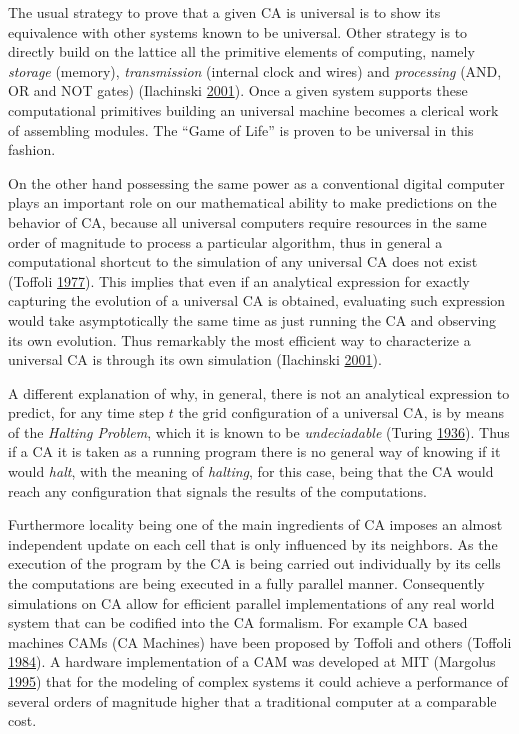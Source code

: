 \documentclass[
  openany]{book}
\begin{document}
The usual strategy to prove that a given CA is universal is to show its equivalence with other systems known to be universal. Other strategy is to directly build on the lattice all the primitive elements of computing, namely \emph{storage} (memory), \emph{transmission} (internal clock and wires) and \emph{processing} (AND, OR and NOT gates) (Ilachinski \protect\hyperlink{ref-ilachinski2001cellular}{2001}). Once a given system supports these computational primitives building an universal machine becomes a clerical work of assembling modules. The ``Game of Life'' is proven to be universal in this fashion.

On the other hand possessing the same power as a conventional digital computer plays an important role on our mathematical ability to make predictions on the behavior of CA, because all universal computers require resources in the same order of magnitude to process a particular algorithm, thus in general a computational shortcut to the simulation of any universal CA does not exist (Toffoli \protect\hyperlink{ref-toffoli1977cellular}{1977}). This implies that even if an analytical expression for exactly capturing the evolution of a universal CA is obtained, evaluating such expression would take asymptotically the same time as just running the CA and observing its own evolution. Thus remarkably the most efficient way to characterize a universal CA is through its own simulation (Ilachinski \protect\hyperlink{ref-ilachinski2001cellular}{2001}).

A different explanation of why, in general, there is not an analytical expression to predict, for any time step \(t\) the grid configuration of a universal CA, is by means of the \emph{Halting Problem}, which it is known to be \emph{undeciadable} (Turing \protect\hyperlink{ref-turing1936computable}{1936}). Thus if a CA it is taken as a running program there is no general way of knowing if it would \emph{halt}, with the meaning of \emph{halting}, for this case, being that the CA would reach any configuration that signals the results of the computations.

Furthermore locality being one of the main ingredients of CA imposes an almost independent update on each cell that is only influenced by its neighbors. As the execution of the program by the CA is being carried out individually by its cells the computations are being executed in a fully parallel manner. Consequently simulations on CA allow for efficient parallel implementations of any real world system that can be codified into the CA formalism. For example CA based machines CAMs (CA Machines) have been proposed by Toffoli and others (Toffoli \protect\hyperlink{ref-toffoli1984cam}{1984}). A hardware implementation of a CAM was developed at MIT (Margolus \protect\hyperlink{ref-margolus1995cam}{1995}) that for the modeling of complex systems it could achieve a performance of several orders of magnitude higher that a traditional computer at a comparable cost.
\end{document}
